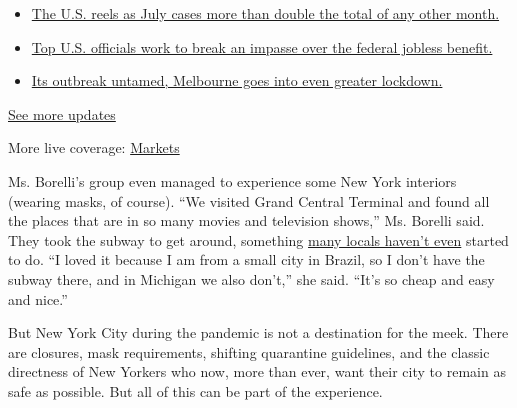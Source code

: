 \begin{itemize}
\tightlist
\item
  \href{https://www.nytimes3xbfgragh.onion/2020/08/01/world/coronavirus-covid-19.html?action=click\&pgtype=Article\&state=default\&region=MAIN_CONTENT_1\&context=storylines_live_updates\#link-34047410}{The
  U.S. reels as July cases more than double the total of any other
  month.}
\item
  \href{https://www.nytimes3xbfgragh.onion/2020/08/01/world/coronavirus-covid-19.html?action=click\&pgtype=Article\&state=default\&region=MAIN_CONTENT_1\&context=storylines_live_updates\#link-780ec966}{Top
  U.S. officials work to break an impasse over the federal jobless
  benefit.}
\item
  \href{https://www.nytimes3xbfgragh.onion/2020/08/01/world/coronavirus-covid-19.html?action=click\&pgtype=Article\&state=default\&region=MAIN_CONTENT_1\&context=storylines_live_updates\#link-2bc8948}{Its
  outbreak untamed, Melbourne goes into even greater lockdown.}
\end{itemize}

\href{https://www.nytimes3xbfgragh.onion/2020/08/01/world/coronavirus-covid-19.html?action=click\&pgtype=Article\&state=default\&region=MAIN_CONTENT_1\&context=storylines_live_updates}{See
more updates}

More live coverage:
\href{https://www.nytimes3xbfgragh.onion/live/2020/07/31/business/stock-market-today-coronavirus?action=click\&pgtype=Article\&state=default\&region=MAIN_CONTENT_1\&context=storylines_live_updates}{Markets}

Ms. Borelli's group even managed to experience some New York interiors
(wearing masks, of course). ``We visited Grand Central Terminal and
found all the places that are in so many movies and television shows,''
Ms. Borelli said. They took the subway to get around, something
\href{https://www.nytimes3xbfgragh.onion/2020/07/17/nyregion/coronavirus-subways-spread-nyc.html}{many
locals haven't even} started to do. ``I loved it because I am from a
small city in Brazil, so I don't have the subway there, and in Michigan
we also don't,'' she said. ``It's so cheap and easy and nice.''

But New York City during the pandemic is not a destination for the meek.
There are closures, mask requirements, shifting quarantine guidelines,
and the classic directness of New Yorkers who now, more than ever, want
their city to remain as safe as possible. But all of this can be part of
the experience.

